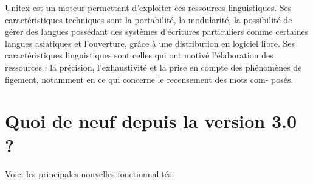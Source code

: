\bigskip
\noindent Unitex est un moteur permettant d’exploiter ces ressources linguistiques. Ses
caractéristiques techniques sont la portabilité, la modularité, la possibilité de gérer des langues
possédant des systèmes d’écritures particuliers comme certaines langues asiatiques et l’ouverture,
grâce à une distribution en logiciel libre. Ses caractéristiques linguistiques sont celles
qui ont motivé l’élaboration des ressources : la précision, l’exhaustivité et la prise en compte
des phénomènes de figement, notamment en ce qui concerne le recensement des mots com-
posés.




\section*{Quoi de neuf depuis la version 3.0 ?}
Voici les principales nouvelles fonctionnalités:
